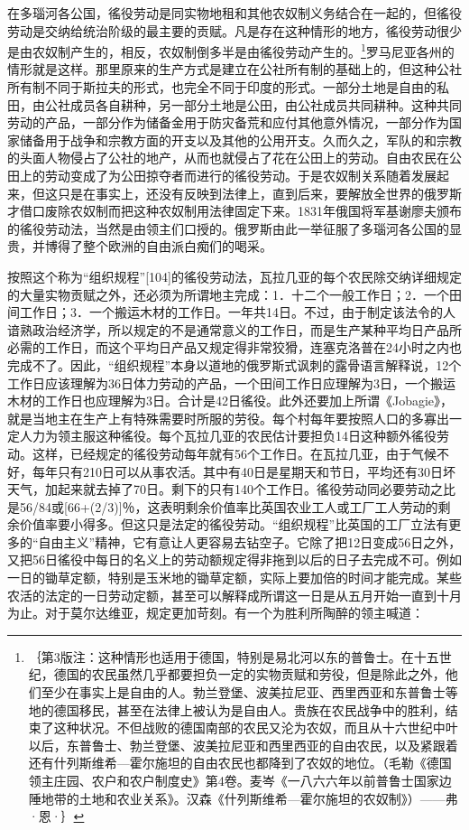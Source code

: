 \documentclass{ctexbook}
\begin{document}
    在多瑙河各公国，徭役劳动是同实物地租和其他农奴制义务结合在一起的，但徭役劳动是交纳给统治阶级的最主要的贡赋。凡是存在这种情形的地方，徭役劳动很少是由农奴制产生的，相反，农奴制倒多半是由徭役劳动产生的。\footnote{｛第3版注：这种情形也适用于德国，特别是易北河以东的普鲁士。在十五世纪，德国的农民虽然几乎都要担负一定的实物贡赋和劳役，但是除此之外，他们至少在事实上是自由的人。勃兰登堡、波美拉尼亚、西里西亚和东普鲁士等地的德国移民，甚至在法律上被认为是自由人。贵族在农民战争中的胜利，结束了这种状况。不但战败的德国南部的农民又沦为农奴，而且从十六世纪中叶以后，东普鲁士、勃兰登堡、波美拉尼亚和西里西亚的自由农民，以及紧跟着还有什列斯维希—霍尔施坦的自由农民也都降到了农奴的地位。（毛勒《德国领主庄园、农户和农户制度史》第4卷。麦岑《一八六六年以前普鲁士国家边陲地带的土地和农业关系》。汉森《什列斯维希—霍尔施坦的农奴制》）——弗·恩·｝}罗马尼亚各州的情形就是这样。那里原来的生产方式是建立在公社所有制的基础上的，但这种公社所有制不同于斯拉夫的形式，也完全不同于印度的形式。一部分土地是自由的私田，由公社成员各自耕种，另一部分土地是公田，由公社成员共同耕种。这种共同劳动的产品，一部分作为储备金用于防灾备荒和应付其他意外情况，一部分作为国家储备用于战争和宗教方面的开支以及其他的公用开支。久而久之，军队的和宗教的头面人物侵占了公社的地产，从而也就侵占了花在公田上的劳动。自由农民在公田上的劳动变成了为公田掠夺者而进行的徭役劳动。于是农奴制关系随着发展起来，但这只是在事实上，还没有反映到法律上，直到后来，要解放全世界的俄罗斯才借口废除农奴制而把这种农奴制用法律固定下来。1831年俄国将军基谢廖夫颁布的徭役劳动法，当然是由领主们口授的。俄罗斯由此一举征服了多瑙河各公国的显贵，并博得了整个欧洲的自由派白痴们的喝采。

    按照这个称为“组织规程”[104]的徭役劳动法，瓦拉几亚的每个农民除交纳详细规定的大量实物贡赋之外，还必须为所谓地主完成：1．十二个一般工作日；2．一个田间工作日；3．一个搬运木材的工作日。一年共14日。不过，由于制定该法令的人谙熟政治经济学，所以规定的不是通常意义的工作日，而是生产某种平均日产品所必需的工作日，而这个平均日产品又规定得非常狡猾，连塞克洛普在24小时之内也完成不了。因此，“组织规程”本身以道地的俄罗斯式讽刺的露骨语言解释说，12个工作日应该理解为36日体力劳动的产品，一个田间工作日应理解为3日，一个搬运木材的工作日也应理解为3日。合计是42日徭役。此外还要加上所谓《Jobagie》，就是当地主在生产上有特殊需要时所服的劳役。每个村每年要按照人口的多寡出一定人力为领主服这种徭役。每个瓦拉几亚的农民估计要担负14日这种额外徭役劳动。这样，已经规定的徭役劳动每年就有56个工作日。在瓦拉几亚，由于气候不好，每年只有210日可以从事农活。其中有40日是星期天和节日，平均还有30日坏天气，加起来就去掉了70日。剩下的只有140个工作日。徭役劳动同必要劳动之比是56/84或[66+(2/3)]％，这表明剩余价值率比英国农业工人或工厂工人劳动的剩余价值率要小得多。但这只是法定的徭役劳动。“组织规程”比英国的工厂立法有更多的“自由主义”精神，它有意让人更容易去钻空子。它除了把12日变成56日之外，又把56日徭役中每日的名义上的劳动额规定得非拖到以后的日子去完成不可。例如一日的锄草定额，特别是玉米地的锄草定额，实际上要加倍的时间才能完成。某些农活的法定的一日劳动定额，甚至可以解释成所谓这一日是从五月开始一直到十月为止。对于莫尔达维亚，规定更加苛刻。有一个为胜利所陶醉的领主喊道：
\end{document}
